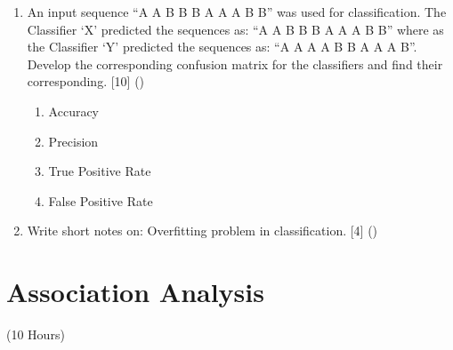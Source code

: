 \documentclass[12pt]{article}
\begin{document}
\begin{enumerate}[topsep=0pt, noitemsep]
      \item An input sequence ``A A B B B A A A B B'' was used for classification. The Classifier `X' predicted the sequences as: ``A A B B B A A A B B'' where as the Classifier `Y' predicted the sequences as: ``A A A A B B A A A B''. Develop the corresponding confusion matrix for the classifiers and find their corresponding. \hfill [10] ()
        \begin{enumerate}[label=\roman*),topsep=2pt,noitemsep]
          \item Accuracy
          \item Precision
          \item True Positive Rate
          \item False Positive Rate
        \end{enumerate}

      \item Write short notes on: Overfitting problem in classification. \hfill [4] ()
    \end{enumerate}

\pagebreak
\section{Association Analysis}
\begin{center}(10 Hours)\end{center}
\end{document}
